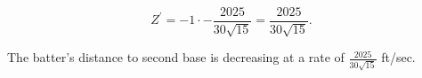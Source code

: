 \documentclass{article}
\begin{document}
\begin{enumerate}[label=\textbf{(10.\arabic*)}]
\[Z^\prime=-1\cdot-\frac{2025}{30\sqrt{15}}=\frac{2025}{30\sqrt{15}}\text{.}\]
\par
\begin{tcolorbox}[colback=white]
\center
The batter's distance to second base is decreasing at a rate of $\frac{2025}{30\sqrt{15}}$ ft/sec.
\end{tcolorbox}

\end{enumerate} 
\end{document}
